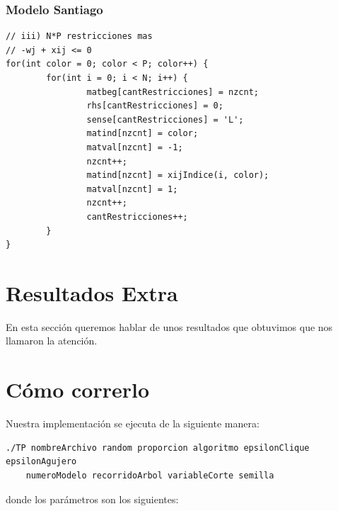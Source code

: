 \documentclass[a4paper, 10pt, twoside]{article}
\begin{document}
\subsubsection{Modelo Santiago}
\label{codigo-modelo-santiago}

\begin{lstlisting}
// iii) N*P restricciones mas
// -wj + xij <= 0
for(int color = 0; color < P; color++) { 
		for(int i = 0; i < N; i++) {
				matbeg[cantRestricciones] = nzcnt;
				rhs[cantRestricciones] = 0;
				sense[cantRestricciones] = 'L';
				matind[nzcnt] = color;
				matval[nzcnt] = -1;
				nzcnt++;
				matind[nzcnt] = xijIndice(i, color);
				matval[nzcnt] = 1;
				nzcnt++;
				cantRestricciones++;
		}
}
\end{lstlisting}


\newpage

\section{Resultados Extra}
En esta sección queremos hablar de unos resultados que obtuvimos que nos llamaron la atención.




\newpage

\section{Cómo correrlo}
\label{como-correrlo}

Nuestra implementación se ejecuta de la siguiente manera:

\begin{verbatim}
./TP nombreArchivo random proporcion algoritmo epsilonClique epsilonAgujero
    numeroModelo recorridoArbol variableCorte semilla
\end{verbatim}

donde los parámetros son los siguientes:
\end{document}
